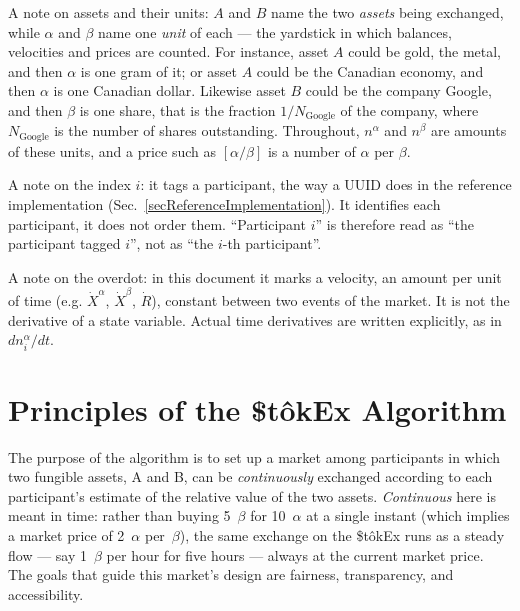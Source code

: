 \documentclass[letterpaper]{article}
\newcommand{\priceAB}{\left[\alpha / \beta\right]}
\newcommand{\StokEx}{\$t\^{o}kEx}
\begin{document}
A note on assets and their units: $A$ and $B$ name the two \emph{assets} being exchanged, while $\alpha$ and $\beta$ name one \emph{unit} of each --- the yardstick in which balances,
velocities and prices are counted. For instance, asset $A$ could be gold, the metal, and then $\alpha$ is one gram of it; or asset $A$ could be the Canadian economy, and then $\alpha$ is one Canadian dollar.
Likewise asset $B$ could be the company Google, and then $\beta$ is one share, that is the fraction $1/N_{\mathrm{Google}}$ of the company, where $N_{\mathrm{Google}}$ is the number of shares outstanding.
Throughout, $n^\alpha$ and $n^\beta$ are amounts of these units, and a price such as $\priceAB$ is a number of $\alpha$ per $\beta$.

A note on the index $i$: it tags a participant, the way a UUID does in the reference implementation (Sec.~\ref{secReferenceImplementation}).
It identifies each participant, it does not order them. ``Participant $i$'' is therefore read as ``the participant tagged $i$'', not as ``the $i$-th participant''.

A note on the overdot: in this document it marks a velocity, an amount per unit of time (e.g. $\dot{X}^\alpha$, $\dot{X}^\beta$, $\dot{R}$), constant between two events of the market.
It is not the derivative of a state variable. Actual time derivatives are written explicitly, as in $dn^\alpha_i/dt$.

\section{Principles of the \StokEx{} Algorithm} %

The purpose of the algorithm is to set up a market among participants in which two fungible assets,
A and B, can be \emph{continuously} exchanged according to each participant's estimate
of the relative value of the two assets.
\emph{Continuous} here is meant in time:
rather than buying 5~$\beta$ for 10~$\alpha$ at a single instant
(which implies a market price of 2~$\alpha$ per~$\beta$),
the same exchange on the \StokEx{} runs as a steady flow --- say 1~$\beta$ per hour for five hours ---
always at the current market price.
The goals that guide this market's design are fairness, transparency, and accessibility.
\end{document}
